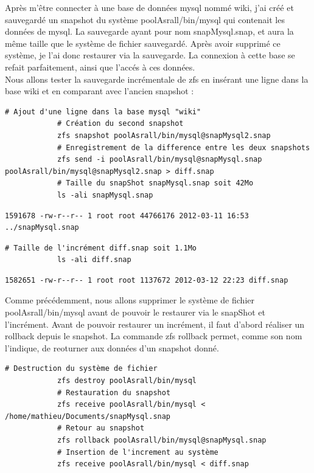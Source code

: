 \documentclass[a4paper]{report}
\begin{document}
		Après m'être connecter à une base de données mysql nommé wiki, j'ai créé et sauvegardé un snapshot du système poolAsrall/bin/mysql qui contenait les données de mysql. La sauvegarde ayant pour nom snapMysql.snap, et aura la même taille que le système de fichier sauvegardé. Après avoir supprimé ce système, je l'ai donc restaurer via la sauvegarde. La connexion à cette base se refait parfaitement, ainsi que l'accés à ces données. \\
		Nous allons tester la sauvegarde incrémentale de zfs en insérant une ligne dans la base wiki et en comparant avec l'ancien snapshot :\\
		\begin{lstlisting}[language=ksh,texcl]
			# Ajout d'une ligne dans la base mysql "wiki"
			# Création du second snapshot
			zfs snapshot poolAsrall/bin/mysql@snapMysql2.snap
			# Enregistrement de la difference entre les deux snapshots
			zfs send -i poolAsrall/bin/mysql@snapMysql.snap poolAsrall/bin/mysql@snapMysql2.snap > diff.snap
			# Taille du snapShot snapMysql.snap soit 42Mo
			ls -ali snapMysql.snap
		\end{lstlisting}
		\begin{lstlisting}[backgroundcolor=\color{yellow}]
			1591678 -rw-r--r-- 1 root root 44766176 2012-03-11 16:53 ../snapMysql.snap
		\end{lstlisting}
		\begin{lstlisting}[language=ksh,texcl]
			# Taille de l'incrément diff.snap soit 1.1Mo
			ls -ali diff.snap
		\end{lstlisting}
		\begin{lstlisting}[backgroundcolor=\color{yellow}]
			1582651 -rw-r--r-- 1 root root 1137672 2012-03-12 22:23 diff.snap
		\end{lstlisting}
		Comme précédemment, nous allons supprimer le système de fichier poolAsrall/bin/mysql avant de pouvoir le restaurer via le snapShot et l'incrément. Avant de pouvoir restaurer un incrément, il faut d'abord réaliser un rollback depuis le snapshot. La commande zfs rollback permet, comme son nom l'indique, de reoturner aux données d'un snapshot donné.
		\begin{lstlisting}[language=ksh,texcl]
			# Destruction du système de fichier
			zfs destroy poolAsrall/bin/mysql
			# Restauration du snapshot
			zfs receive poolAsrall/bin/mysql < /home/mathieu/Documents/snapMysql.snap
			# Retour au snapshot
			zfs rollback poolAsrall/bin/mysql@snapMysql.snap
			# Insertion de l'increment au système
			zfs receive poolAsrall/bin/mysql < diff.snap
		\end{lstlisting}		
		
\end{document}
